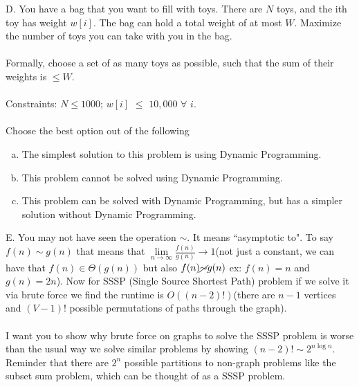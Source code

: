 \documentclass[12pt]{article}
\begin{document}
D. You have a bag that you want to fill with toys. 
There are $N$ toys, and the ith toy has weight $w[i]$. The bag 
can hold a total weight of at most $W$. Maximize the number 
of toys you can take with you in the bag.\\\\
Formally, choose a set of as many toys as possible, 
such that the sum of their weights is $\leq W$.\\\\
Constraints: $N \leq 1000$; $w[i]$ $\leq$ $10,000$ $\forall$ $i$.\\\\
Choose the best option out of the following
\begin{enumerate}[a)]
    \item The simplest solution to this problem is using Dynamic Programming.
    \item This problem cannot be solved using Dynamic Programming.
    \item This problem can be solved with Dynamic Programming, but has a simpler solution without Dynamic Programming.
\end{enumerate}
\newpage
\noindent E. You may not have seen the operation $\sim$. 
It means ``asymptotic to". To say $f(n) \sim g(n)$ that means that 
$\lim\limits_{n\to\infty}\frac{f(n)}{g(n)} \to 1$(not just a constant, we can have that $f(n) \in \Theta (g(n))$
but also $f(n) \cancel{\sim} g(n)$ ex: $f(n) = n$ and $g(n) = 2n$). Now for SSSP (Single Source Shortest Path) problem
if we solve it via brute force we find the runtime is $O((n-2)!)$(there are $n-1$ 
vertices and $(V-1)!$ possible permutations of paths through the graph).\\\\
I want you to show why brute force on graphs to solve the SSSP problem is worse than
the usual way we solve similar problems by showing $(n-2)! \sim 2^{n\log{n}}$. 
Reminder that there are $2^{n}$ possible partitions to non-graph problems 
like the subset sum problem, which can be thought of as a SSSP problem.
\newpage
\end{document}
